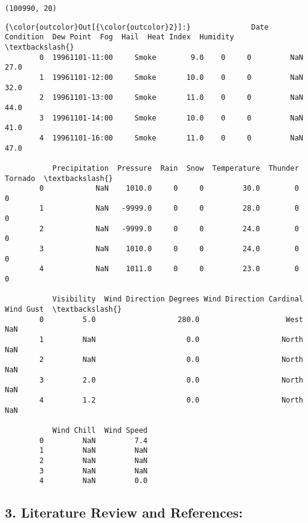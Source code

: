 \documentclass[11pt]{article}
\begin{document}
    \begin{Verbatim}[commandchars=\\\{\}]
(100990, 20)

    \end{Verbatim}

\begin{Verbatim}[commandchars=\\\{\}]
{\color{outcolor}Out[{\color{outcolor}2}]:}              Date Condition  Dew Point  Fog  Hail  Heat Index  Humidity  \textbackslash{}
        0  19961101-11:00     Smoke        9.0    0     0         NaN      27.0   
        1  19961101-12:00     Smoke       10.0    0     0         NaN      32.0   
        2  19961101-13:00     Smoke       11.0    0     0         NaN      44.0   
        3  19961101-14:00     Smoke       10.0    0     0         NaN      41.0   
        4  19961101-16:00     Smoke       11.0    0     0         NaN      47.0   
        
           Precipitation  Pressure  Rain  Snow  Temperature  Thunder  Tornado  \textbackslash{}
        0            NaN    1010.0     0     0         30.0        0        0   
        1            NaN   -9999.0     0     0         28.0        0        0   
        2            NaN   -9999.0     0     0         24.0        0        0   
        3            NaN    1010.0     0     0         24.0        0        0   
        4            NaN    1011.0     0     0         23.0        0        0   
        
           Visibility  Wind Direction Degrees Wind Direction Cardinal  Wind Gust  \textbackslash{}
        0         5.0                   280.0                    West        NaN   
        1         NaN                     0.0                   North        NaN   
        2         NaN                     0.0                   North        NaN   
        3         2.0                     0.0                   North        NaN   
        4         1.2                     0.0                   North        NaN   
        
           Wind Chill  Wind Speed  
        0         NaN         7.4  
        1         NaN         NaN  
        2         NaN         NaN  
        3         NaN         NaN  
        4         NaN         0.0  
\end{Verbatim}
            
    \subsection{3. Literature Review and
References:}\label{literature-review-and-references}
\end{document}
